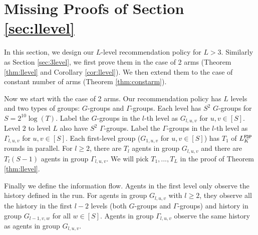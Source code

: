 
\section{Missing Proofs of Section \ref{sec:llevel}}
\label{sec:llevel-details}
In this section, we design our $L$-level recommendation policy for $L > 3$. Similarly as Section \ref{sec:3level}, we first prove them in the case of 2 arms (Theorem \ref{thm:llevel} and Corollary \ref{cor:llevel}). We then extend them to the case of constant number of arms (Theorem \ref{thm:constarm}). 

Now we start with the case of 2 arms. Our recommendation policy has $L$ levels and two types of groups: $G$-groups and $\Gamma$-groups. Each level has $S^2$ $G$-groups for $S = 2^{10}\log(T)$. Label the $G$-groups in the $l$-th level as $G_{l,u,v}$ for $u,v \in [S]$. Level $2$ to level $L$ also have $S^2$ $\Gamma$-groups. Label the $\Gamma$-groups in the $l$-th level as $\Gamma_{l,u,v}$ for $u,v \in [S]$. Each first-level group ($G_{1,u,v}$ for $u,v\in [S]$) has $T_1$ \ALGG of $L^\mathtt{FDP}_K$ rounds in parallel. For $l \geq 2$, there are $T_l$ agents in group $G_{l,u,v}$ and there are $T_l (S-1)$ agents in group $\Gamma_{l,u,v}$. We will pick $T_1,...,T_L$ in the proof of Theorem \ref{thm:llevel}.

Finally we define the information flow. Agents in the first level only observe the history defined in the \ALGG run. For agents in group $G_{l,u,v}$ with $l\geq 2$, they observe all the history in the first $l-2$ levels (both $G$-groups and $\Gamma$-groups) and history in group $G_{l-1,v,w}$ for all $w \in [S]$. Agents in group $\Gamma_{l,u,v}$ observe the same history as agents in group $G_{l,u,v}$.
 
